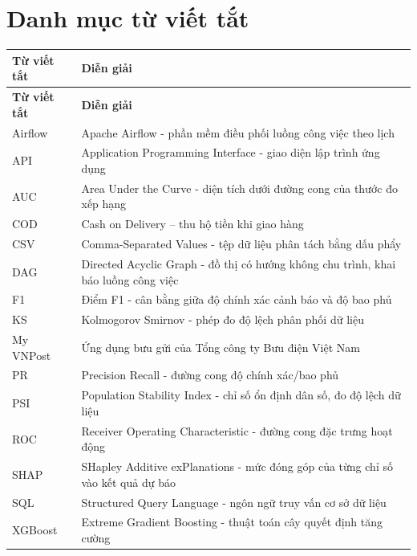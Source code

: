 \chapter*{Danh mục từ viết tắt}
\begin{longtable}{@{}p{3.2cm}p{11.5cm}@{}}
\toprule
\textbf{Từ viết tắt} & \textbf{Diễn giải} \\
\midrule
\endfirsthead
\toprule
\textbf{Từ viết tắt} & \textbf{Diễn giải} \\
\midrule
\endhead
\bottomrule
\endfoot
Airflow & Apache Airflow - phần mềm điều phối luồng công việc theo lịch \\
API & Application Programming Interface - giao diện lập trình ứng dụng \\
AUC & Area Under the Curve - diện tích dưới đường cong của thước đo xếp hạng \\
COD & Cash on Delivery -- thu hộ tiền khi giao hàng \\
CSV & Comma-Separated Values - tệp dữ liệu phân tách bằng dấu phẩy \\
DAG & Directed Acyclic Graph - đồ thị có hướng không chu trình, khai báo luồng công việc \\
F1 & Điểm F1 - cân bằng giữa độ chính xác cảnh báo và độ bao phủ \\
KS & Kolmogorov Smirnov - phép đo độ lệch phân phối dữ liệu \\
My VNPost & Ứng dụng bưu gửi của Tổng công ty Bưu điện Việt Nam \\
PR & Precision Recall - đường cong độ chính xác/bao phủ \\
PSI & Population Stability Index - chỉ số ổn định dân số, đo độ lệch dữ liệu \\
ROC & Receiver Operating Characteristic - đường cong đặc trưng hoạt động \\
SHAP & SHapley Additive exPlanations - mức đóng góp của từng chỉ số vào kết quả dự báo \\
SQL & Structured Query Language - ngôn ngữ truy vấn cơ sở dữ liệu \\
XGBoost & Extreme Gradient Boosting - thuật toán cây quyết định tăng cường \\
\end{longtable}
